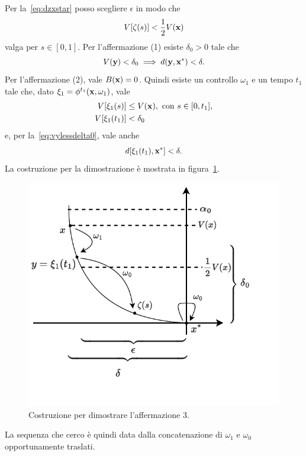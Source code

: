 \begin{steps}
    Per la~\eqref{eq:dzxstar} posso scegliere $\epsilon$ in modo che
    \begin{equation*}
        V[\zeta(s)] < \frac 1 2 V(\mathbf{x})
    \end{equation*}
    valga per $s \in [0, 1]$.
    Per l'affermazione (1) esiste $\delta_0 > 0$ tale che
    \begin{equation}
        V(\mathbf{y}) < \delta_0 \implies d(\mathbf{y}, \mathbf{x}^*) < \delta.
        \label{eq:vylessdelta0}
    \end{equation}
    Per l'affermazione (2), vale $B(\mathbf{x}) = 0$.
    Quindi esiste un controllo $\omega_1$ e un tempo $t_1$ tale
    che, dato $\xi_1 = \phi^{t_1}(\mathbf{x}, \omega_1)$, vale
    \begin{align*}
        V[\xi_1(s)] &\leq V(\mathbf{x}), \text{ con } s \in [0, t_1],\\
        V[\xi_1(t_1)] &< \delta_0
    \end{align*}
    e, per la~\eqref{eq:vylessdelta0}, vale anche
    \begin{equation*}
        d[\xi_1(t_1), \mathbf{x}^*] < \delta.
    \end{equation*}
    La costruzione per la dimostrazione è mostrata in figura~\ref{fig:ljapunov-dim-aff3}.

    \hfill
    \begin{minipage}{.8\textwidth}
        \begin{figure}[H]
            \centering
            \includegraphics[width=.6\textwidth]{assets/ljapunov-dim-aff3}
            \caption[Costruzione 3 per teorema di Ljapunov]{Costruzione per dimostrare
            l'affermazione 3.}%
            \label{fig:ljapunov-dim-aff3}
        \end{figure}
    \end{minipage}

    La sequenza che cerco è quindi data dalla concatenazione di
    $\omega_1$ e $\omega_0$ opportunamente traslati.


\end{steps}
